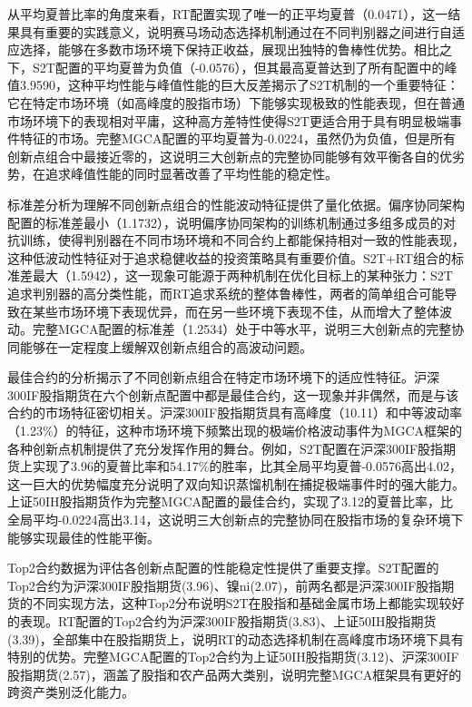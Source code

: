 从平均夏普比率的角度来看，RT配置实现了唯一的正平均夏普（0.0471），这一结果具有重要的实践意义，说明赛马场动态选择机制通过在不同判别器之间进行自适应选择，能够在多数市场环境下保持正收益，展现出独特的鲁棒性优势。相比之下，S2T配置的平均夏普为负值（-0.0576），但其最高夏普达到了所有配置中的峰值3.9590，这种平均性能与峰值性能的巨大反差揭示了S2T机制的一个重要特征：它在特定市场环境（如高峰度的股指市场）下能够实现极致的性能表现，但在普通市场环境下的表现相对平庸，这种高方差特性使得S2T更适合用于具有明显极端事件特征的市场。完整MGCA配置的平均夏普为-0.0224，虽然仍为负值，但是所有创新点组合中最接近零的，这说明三大创新点的完整协同能够有效平衡各自的优劣势，在追求峰值性能的同时显著改善了平均性能的稳定性。

标准差分析为理解不同创新点组合的性能波动特征提供了量化依据。偏序协同架构配置的标准差最小（1.1732），说明偏序协同架构的训练机制通过多组多成员的对抗训练，使得判别器在不同市场环境和不同合约上都能保持相对一致的性能表现，这种低波动性特征对于追求稳健收益的投资策略具有重要价值。S2T+RT组合的标准差最大（1.5942），这一现象可能源于两种机制在优化目标上的某种张力：S2T追求判别器的高分类性能，而RT追求系统的整体鲁棒性，两者的简单组合可能导致在某些市场环境下表现优异，而在另一些环境下表现不佳，从而增大了整体波动。完整MGCA配置的标准差（1.2534）处于中等水平，说明三大创新点的完整协同能够在一定程度上缓解双创新点组合的高波动问题。

最佳合约的分析揭示了不同创新点组合在特定市场环境下的适应性特征。沪深300IF股指期货在六个创新点配置中都是最佳合约，这一现象并非偶然，而是与该合约的市场特征密切相关。沪深300IF股指期货具有高峰度（10.11）和中等波动率（1.23\%）的特征，这种市场环境下频繁出现的极端价格波动事件为MGCA框架的各种创新点机制提供了充分发挥作用的舞台。例如，S2T配置在沪深300IF股指期货上实现了3.96的夏普比率和54.17\%的胜率，比其全局平均夏普-0.0576高出4.02，这一巨大的优势幅度充分说明了双向知识蒸馏机制在捕捉极端事件时的强大能力。上证50IH股指期货作为完整MGCA配置的最佳合约，实现了3.12的夏普比率，比全局平均-0.0224高出3.14，这说明三大创新点的完整协同在股指市场的复杂环境下能够实现最佳的性能平衡。

Top2合约数据为评估各创新点配置的性能稳定性提供了重要支撑。S2T配置的Top2合约为沪深300IF股指期货(3.96)、镍ni(2.07)，前两名都是沪深300IF股指期货的不同实现方法，这种Top2分布说明S2T在股指和基础金属市场上都能实现较好的表现。RT配置的Top2合约为沪深300IF股指期货(3.83)、上证50IH股指期货(3.39)，全部集中在股指期货上，说明RT的动态选择机制在高峰度市场环境下具有特别的优势。完整MGCA配置的Top2合约为上证50IH股指期货(3.12)、沪深300IF股指期货(2.57)，涵盖了股指和农产品两大类别，说明完整MGCA框架具有更好的跨资产类别泛化能力。

